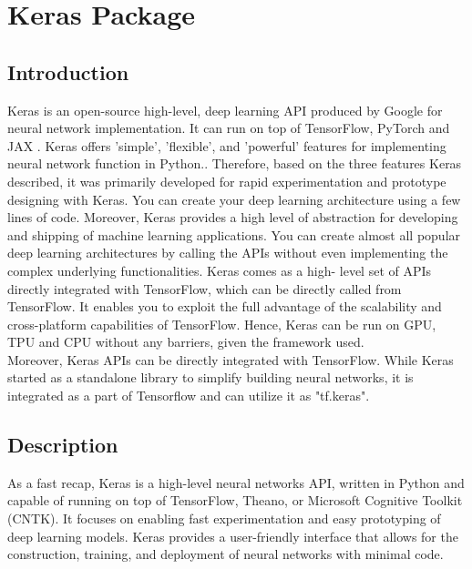 %
%


\chapter{Keras Package}
\section{Introduction}
Keras is an open-source high-level, deep learning API produced by Google for neural network implementation. It can run on top of TensorFlow, PyTorch and JAX . Keras offers 'simple', 'flexible', and 'powerful' features for implementing neural network function in Python.\cite{kerasteam:2024}. 
Therefore, based on the three features Keras described, it was primarily developed for rapid experimentation and prototype designing with Keras. You can create your deep learning architecture using a few lines of code. Moreover, Keras provides a high level of abstraction for developing and shipping of machine learning applications. You can create almost all popular deep learning architectures by calling the APIs without even implementing
the complex underlying functionalities. Keras comes as a high- level set of APIs directly integrated with TensorFlow, which can be directly called from TensorFlow. It enables you to exploit the full advantage of the scalability and cross-platform
capabilities of TensorFlow. Hence, Keras can be run on GPU, TPU and CPU without any barriers, given the framework used.\cite{Kerasteam:2024} \\

Moreover, Keras APIs can be directly integrated with TensorFlow. While Keras started as a standalone library to simplify building neural networks, it is integrated as a part of Tensorflow and can utilize it as "tf.keras". \cite{keras:2023}


\section{Description}
As a fast recap, Keras is a high-level neural networks API, written in Python and capable of running on top of TensorFlow, Theano, or Microsoft Cognitive Toolkit (CNTK).\cite{simplilearn:2024} It focuses on enabling fast experimentation and easy prototyping of deep learning models. Keras provides a user-friendly interface that allows for the construction, training, and deployment of neural networks with minimal code.\\

